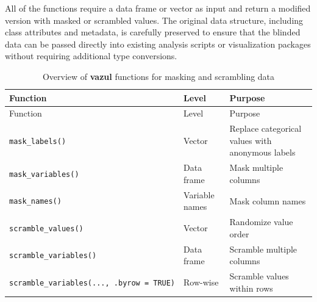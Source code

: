 \documentclass[
  english,
  man,floatsintext]{apa6}
\begin{document}
All of the functions require a data frame or vector as input and return a modified version with masked or scrambled values. The original data structure, including class attributes and metadata, is carefully preserved to ensure that the blinded data can be passed directly into existing analysis scripts or visualization packages without requiring additional type conversions.

\begin{longtable}[]{@{}
  >{\raggedright\arraybackslash}p{}
  >{\raggedright\arraybackslash}p{}
  >{\raggedright\arraybackslash}p{}@{}}
\caption{Overview of \textbf{vazul} functions for masking and scrambling data}\tabularnewline
\toprule\noalign{}
\begin{minipage}[b]{\linewidth}\raggedright
Function
\end{minipage} & \begin{minipage}[b]{\linewidth}\raggedright
Level
\end{minipage} & \begin{minipage}[b]{\linewidth}\raggedright
Purpose
\end{minipage} \\
\midrule\noalign{}
\endfirsthead
\toprule\noalign{}
\begin{minipage}[b]{\linewidth}\raggedright
Function
\end{minipage} & \begin{minipage}[b]{\linewidth}\raggedright
Level
\end{minipage} & \begin{minipage}[b]{\linewidth}\raggedright
Purpose
\end{minipage} \\
\midrule\noalign{}
\endhead
\bottomrule\noalign{}
\endlastfoot
\texttt{mask\_labels()} & Vector & Replace categorical values with anonymous labels \\
\texttt{mask\_variables()} & Data frame & Mask multiple columns \\
\texttt{mask\_names()} & Variable names & Mask column names \\
\texttt{scramble\_values()} & Vector & Randomize value order \\
\texttt{scramble\_variables()} & Data frame & Scramble multiple columns \\
\texttt{scramble\_variables(...,\ .byrow\ =\ TRUE)} & Row-wise & Scramble values within rows \\
\end{longtable}
\end{document}
